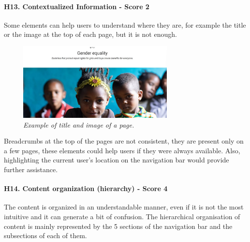\newline
\newline \paragraph{H13. Contextualized Information - Score 2}  \label{subsec:H13}	Some elements can help users to understand where they are, for example the title or the image at the top of each page, but it is not enough.
\begin{figure}[!h]
	\begin{center}
		\includegraphics[width=0.7\textwidth]{FinalScores17.jpg}
		\captionsetup{font=small}
		\caption{\textit{Example of title and image of a page.}}
	\end{center}
\end{figure}
\newline Breadcrumbs at the top of the pages are not consistent, they are present only on a few pages, these elements could help users if they were always available.
\newline Also, highlighting the current user's location on the navigation bar would provide further assistance.
\newline
\newline \paragraph{H14. Content organization (hierarchy) - Score 4}  \label{subsec:H14}	The content is organized in an understandable manner, even if it is not the most intuitive and it can generate a bit of confusion.
\newline The hierarchical organisation of content is mainly represented by the 5 sections of the navigation bar and the subsections of each of them.   
